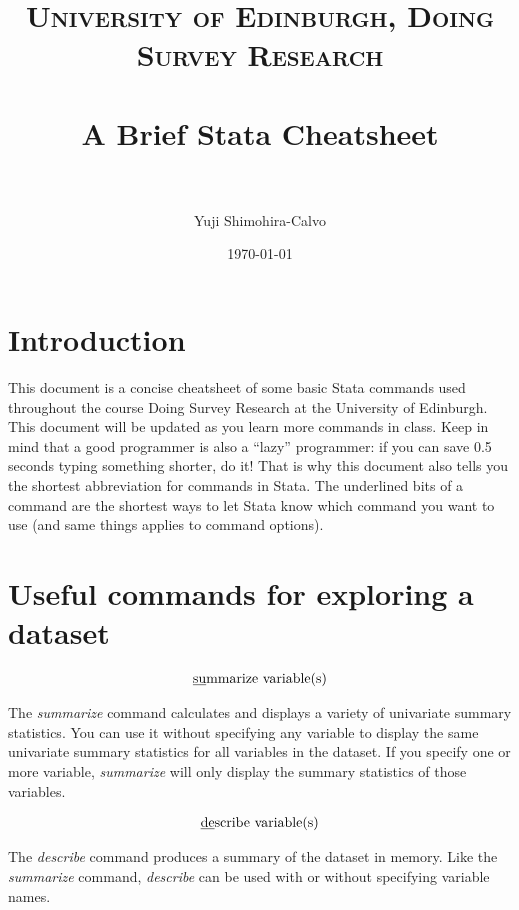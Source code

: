 \documentclass[paper=a4, fontsize=11pt]{scrartcl} %
\title{	
\normalfont \normalsize 
\textsc{University of Edinburgh, Doing Survey Research} \\ [25pt] %
\horrule{0.5pt} \\[0.4cm] %
\huge A Brief Stata Cheatsheet \\ %
\horrule{2pt} \\[0.5cm] %
}
\author{Yuji Shimohira-Calvo} %
\date{\normalsize\today} %
\numberwithin{equation}{section} %
\numberwithin{figure}{section} %
\numberwithin{table}{section} %
\begin{document}
\maketitle %


\section*{Introduction}

This document is a concise cheatsheet of some basic Stata commands used throughout the course Doing Survey Research at the University of Edinburgh. This document will be updated as you learn more commands in class. Keep in mind that a good programmer is also a ``lazy'' programmer: if you can save 0.5 seconds typing something shorter, do it! That is why this document also tells you the shortest abbreviation for commands in Stata. The underlined bits of a command are the shortest ways to let Stata know which command you want to use (and same things applies to command options). 


\section{Useful commands for exploring a dataset}

\begin{align} 
\text{\underline{su}mmarize variable(s)}
\end{align}

The \textit{summarize} command calculates and displays a variety of univariate summary statistics. You can use it without specifying any variable to display the same univariate summary statistics for all variables in the dataset. If you specify one or more variable, \textit{summarize} will only display the summary statistics of those variables.

\begin{align}
	\text{\underline{de}scribe variable(s)}
\end{align}

The \textit{describe} command produces a summary of the dataset in memory. Like the \textit{summarize} command, \textit{describe} can be used with or without specifying variable names.
\end{document}
